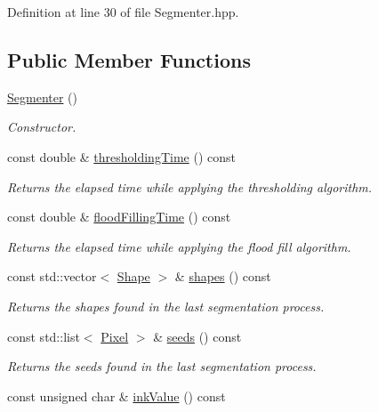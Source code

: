 Definition at line 30 of file Segmenter.hpp.\subsection*{Public Member Functions}
\begin{CompactItemize}
\item 
\hyperlink{class_segmenter_d39ec3bda31be180820aa0bdca7b125d}{Segmenter} ()
\begin{CompactList}\small\item\em Constructor. \item\end{CompactList}\item 
const double \& \hyperlink{class_segmenter_52f771c61d667df4f552ee73dc9f22e7}{thresholdingTime} () const 
\begin{CompactList}\small\item\em Returns the elapsed time while applying the thresholding algorithm. \item\end{CompactList}\item 
const double \& \hyperlink{class_segmenter_e7c93cb16e314baeb713bbd6ca9b667b}{floodFillingTime} () const 
\begin{CompactList}\small\item\em Returns the elapsed time while applying the flood fill algorithm. \item\end{CompactList}\item 
const std::vector$<$ \hyperlink{class_shape}{Shape} $>$ \& \hyperlink{class_segmenter_f2dd7f34c8b0f902323005335e41bd57}{shapes} () const 
\begin{CompactList}\small\item\em Returns the shapes found in the last segmentation process. \item\end{CompactList}\item 
const std::list$<$ \hyperlink{_pixel_8hpp_535e59456e3e633842529cfa8ea103c4}{Pixel} $>$ \& \hyperlink{class_segmenter_519d84c033b647342c3397a0bf479d9e}{seeds} () const 
\begin{CompactList}\small\item\em Returns the seeds found in the last segmentation process. \item\end{CompactList}\item 
const unsigned char \& \hyperlink{class_segmenter_e9bc56ddcbe5ea4abb40fcc85e3d9fbe}{inkValue} () const 

\end{CompactItemize}
